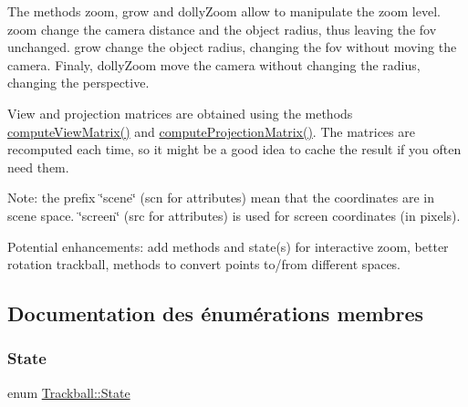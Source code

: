 The methods zoom, grow and dolly\+Zoom allow to manipulate the zoom level. zoom change the camera distance and the object radius, thus leaving the fov unchanged. grow change the object radius, changing the fov without moving the camera. Finaly, dolly\+Zoom move the camera without changing the radius, changing the perspective.

View and projection matrices are obtained using the methods \hyperlink{class_trackball_acb8ad68c2077f4ff149e501acfe67d50}{compute\+View\+Matrix()} and \hyperlink{class_trackball_a4d156f831f9c5eac08ca40283327fb3d}{compute\+Projection\+Matrix()}. The matrices are recomputed each time, so it might be a good idea to cache the result if you often need them.

Note\+: the prefix \char`\"{}scene\char`\"{} (scn for attributes) mean that the coordinates are in scene space. \char`\"{}screen\char`\"{} (src for attributes) is used for screen coordinates (in pixels).

Potential enhancements\+: add methods and state(s) for interactive zoom, better rotation trackball, methods to convert points to/from different spaces. 

\subsection{Documentation des énumérations membres}
\mbox{\label{class_trackball_a102216413a87cb37801044063a1b05be}} 
\subsubsection{\texorpdfstring{State}{State}}
{\footnotesize\ttfamily enum \hyperlink{class_trackball_a102216413a87cb37801044063a1b05be}{Trackball\+::\+State}}


